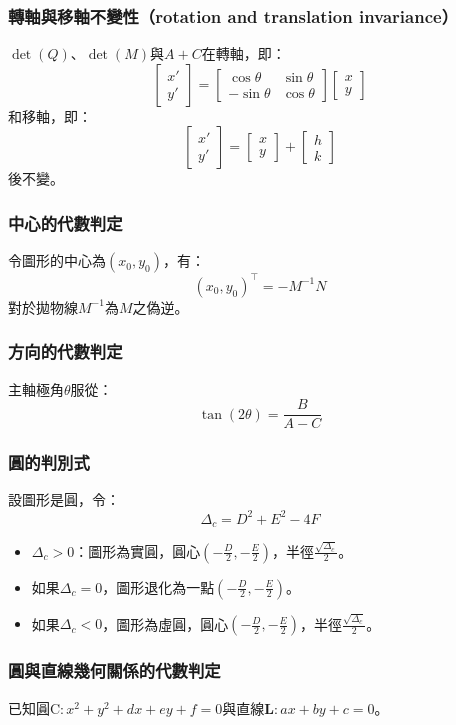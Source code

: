 \documentclass[a4paper,12pt]{report}
\begin{document}
\subsubsection{轉軸與移軸不變性（rotation and translation invariance）}
$\det(Q)$、$\det(M)$與$A+C$在轉軸，即：
\[\begin{bmatrix} x' \\ y' \end{bmatrix} = \begin{bmatrix} \cos\theta & \sin\theta \\ -\sin\theta & \cos\theta \end{bmatrix}\begin{bmatrix} x \\ y \end{bmatrix}\]
和移軸，即：
\[\begin{bmatrix} x' \\ y' \end{bmatrix} = \begin{bmatrix} x \\ y \end{bmatrix}+\begin{bmatrix} h \\ k \end{bmatrix}\]
後不變。
\subsubsection{中心的代數判定}
令圖形的中心為$(x_0,y_0)$，有：
\[(x_0,y_0)^{\top}=-M^{-1}N\]
對於拋物線$M^{-1}$為$M$之偽逆。
\subsubsection{方向的代數判定}
主軸極角$\theta$服從：
\[\tan(2\theta)=\frac{B}{A-C}\]
\subsubsection{圓的判別式}
設圖形是圓，令：
\[\Delta_c=D^2+E^2-4F\]
\begin{itemize}
\item $\Delta_c>0$：圖形為實圓，圓心$(-\frac{D}{2},-\frac{E}{2})$，半徑$\frac{\sqrt{\Delta_c}}{2}$。
\item 如果$\Delta_c=0$，圖形退化為一點$(-\frac{D}{2},-\frac{E}{2})$。
\item 如果$\Delta_c<0$，圖形為虛圓，圓心$(-\frac{D}{2},-\frac{E}{2})$，半徑$\frac{\sqrt{\Delta_c}}{2}$。
\end{itemize}
\subsubsection{圓與直線幾何關係的代數判定}
已知圓$\mathrm{C}:x^2+y^2+dx+ey+f=0$與直線$\mathbf{L}:ax+by+c=0$。
\end{document}
